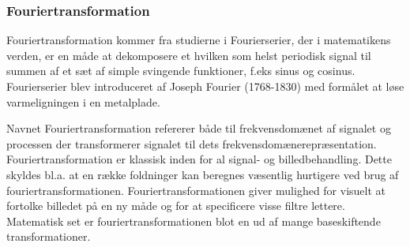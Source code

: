 \subsubsection{Fouriertransformation}
Fouriertransformation kommer fra studierne i Fourierserier, der i matematikens verden, er en måde at dekomposere et hvilken som helst periodisk signal til summen af et sæt af simple svingende funktioner, f.eks sinus og cosinus. Fourierserier blev introduceret af Joseph Fourier (1768-1830) med formålet at løse varmeligningen i en metalplade.

Navnet Fouriertransformation refererer både til frekvensdomænet af signalet og processen der transformerer signalet til dets frekvensdomænerepræsentation. Fouriertransformation er klassisk inden for al signal- og billedbehandling. Dette skyldes bl.a. at en række foldninger kan beregnes væsentlig hurtigere ved brug af fouriertransformationen. Fouriertransformationen giver mulighed for visuelt at fortolke billedet på en ny måde og for at specificere visse filtre lettere. Matematisk set er fouriertransformationen blot en ud af mange baseskiftende transformationer.

